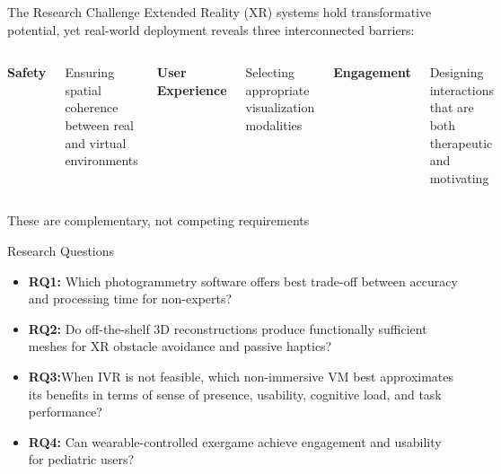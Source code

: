 \documentclass[aspectratio=169, 12pt]{beamer}
\begin{document}
\begin{frame}{The Research Challenge}
	Extended Reality (XR) systems hold transformative potential, yet real-world deployment reveals three interconnected barriers:
	
	\vspace{0.5cm}
	
	\begin{columns}[t]
		\textbf{\textcolor{gbAqua}{Safety}}
		
		Ensuring spatial coherence between real and virtual environments
		
		\textbf{\textcolor{gbAqua}{User Experience}}
		
		Selecting appropriate visualization modalities
		
		\textbf{\textcolor{gbAqua}{Engagement}}
		
		Designing interactions that are both therapeutic and motivating
	\end{columns}
	
	\vspace{0.5cm}
	
	\alert{These are complementary, not competing requirements}
\end{frame}

\begin{frame}{Research Questions}
	\begin{itemize}
		\item \textbf{RQ1:} Which photogrammetry software offers best trade-off between accuracy and processing time for non-experts?
		
		\vspace{0.3cm}
		
		\item \textbf{RQ2:} Do off-the-shelf 3D reconstructions produce functionally sufficient meshes for XR obstacle avoidance and passive haptics?
		
		\vspace{0.3cm}
		
		\item \textbf{RQ3:}When IVR is not feasible, which non-immersive VM best approximates its benefits in terms of sense of presence, usability, cognitive load, and task performance?
		
		\vspace{0.3cm}
		
		\item \textbf{RQ4:} Can wearable-controlled exergame achieve engagement and usability for pediatric users?
	\end{itemize}
\end{frame}
\end{document}
